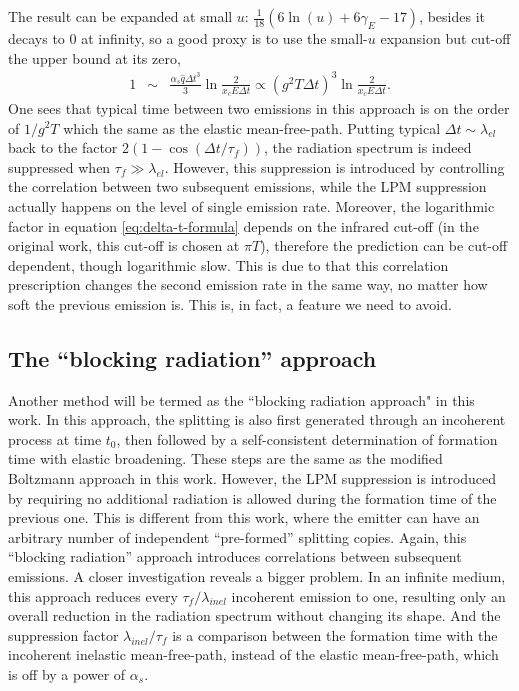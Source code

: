 \documentclass[aps, prc, reprint, amsmath, groupedaddress, nofootinbib]{revtex4-1}
\begin{document}
The result can be expanded at small $u$: $\frac{1}{18}(6\ln(u)+6\gamma_E - 17)$, besides it decays to $0$ at infinity, so a good proxy is to use the small-$u$ expansion but cut-off the upper bound at its zero,
\begin{eqnarray}
1 &\sim&  \frac{\alpha_s\hat{q}\Delta t^3}{3}\ln\frac{2}{ x_c E \Delta t } \propto (g^2 T \Delta t)^3 \ln\frac{2}{ x_c E \Delta t }.
\label{eq:delta-t-formula}
\end{eqnarray}
One sees that typical time between two emissions in this approach is on the order of $1/g^2T$ which the same as the elastic mean-free-path.
Putting typical $\Delta t \sim \lambda_{el}$ back to the factor $2(1-\cos(\Delta t/\tau_f))$, the radiation spectrum is indeed suppressed when $\tau_f \gg \lambda_{el}$.
However, this suppression is introduced by controlling the correlation between two subsequent emissions, while the LPM suppression actually happens on the level of single emission rate.
Moreover, the logarithmic factor in equation \ref{eq:delta-t-formula} depends on the infrared cut-off (in the original work, this cut-off is chosen at $\pi T$), therefore the prediction can be cut-off dependent, though logarithmic slow.
This is due to that this correlation prescription changes the second emission rate in the same way, no matter how soft the previous emission is.
This is, in fact, a feature we need to avoid.

\subsection{The ``blocking radiation'' approach}
Another method \cite{ColemanSmith:2012vr} will be termed as the ``blocking radiation approach" in this work.
In this approach, the splitting is also first generated through an incoherent process at time $t_0$, then followed by a self-consistent determination of formation time with elastic broadening.
These steps are the same as the modified Boltzmann approach in this work.
However, the LPM suppression is introduced by requiring no additional radiation is allowed during the formation time of the previous one. 
This is different from this work, where the emitter can have an arbitrary number of independent ``pre-formed'' splitting copies.
Again, this ``blocking radiation'' approach introduces correlations between subsequent emissions.
A closer investigation reveals a bigger problem.
In an infinite medium, this approach reduces every $\tau_f/\lambda_{inel}$ incoherent emission to one, resulting only an overall reduction in the radiation spectrum without changing its shape.
And the suppression factor $\lambda_{inel}/\tau_f$ is a comparison between the formation time with the incoherent inelastic mean-free-path, instead of the elastic mean-free-path, which is off by a power of $\alpha_s$.
\end{document}
